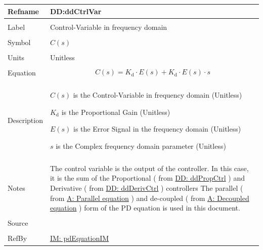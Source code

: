 \documentclass[12pt]{article}
\begin{document}
\vspace{\baselineskip}
\noindent
\begin{minipage}{\textwidth}
\begin{tabular}{>{\raggedright}p{}>{\raggedright\arraybackslash}p{}}
\toprule \textbf{Refname} & \textbf{DD:ddCtrlVar}
\label{DD:ddCtrlVar}
\\ \midrule \\
Label & Control-Variable in frequency domain
        
\\ \midrule \\
Symbol & $C(s)$
         
\\ \midrule \\
Units & Unitless
        
\\ \midrule \\
Equation & \begin{displaymath}
           C(s)={K_{\text{d}}}\cdot{}E(s)+{K_{\text{d}}}\cdot{}E(s)\cdot{}s
           \end{displaymath}
\\ \midrule \\
Description & \begin{symbDescription}
              \item{$C(s)$ is the Control-Variable in frequency domain (Unitless)}
              \item{${K_{\text{d}}}$ is the Proportional Gain (Unitless)}
              \item{$E(s)$ is the Error Signal in the frequency domain (Unitless)}
              \item{$s$ is the Complex frequency domain parameter (Unitless)}
              \end{symbDescription}
\\ \midrule \\
Notes & The control variable is the output of the controller. In this case, it is the sum of the Proportional ( from \hyperref[DD:ddPropCtrl]{DD: ddPropCtrl} ) and Derivative ( from  \hyperref[DD:ddDerivCtrl]{DD: ddDerivCtrl} ) controllers The parallel ( from \hyperref[parallelEq]{A: Parallel equation} ) and de-coupled ( from \hyperref[decoupled]{A: Decoupled equation} ) form of the PD equation is used in this document.
        
\\ \midrule \\
Source & \cite{johnson2008}
         
\\ \midrule \\
RefBy & \hyperref[IM:pdEquationIM]{IM: pdEquationIM}
        
\\ \bottomrule
\end{tabular}
\end{minipage}
\end{document}

